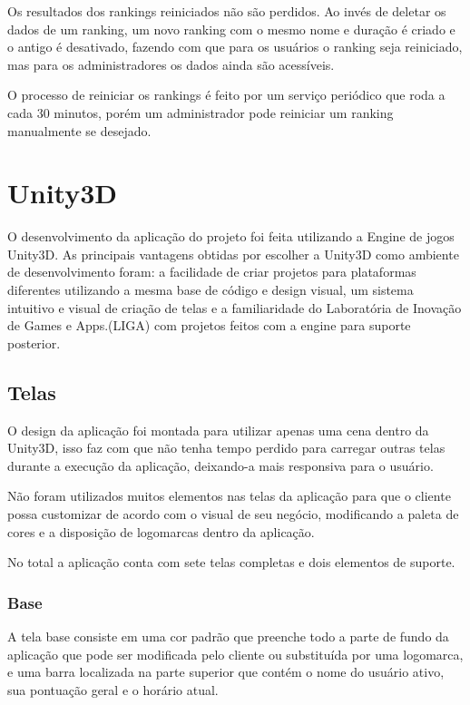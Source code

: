 Os resultados dos rankings reiniciados não são perdidos. Ao invés de deletar os dados de um ranking, um novo ranking com o mesmo nome e duração é criado e o antigo é desativado, fazendo com que para os usuários o ranking seja reiniciado, mas para os administradores os dados ainda são acessíveis.

O processo de reiniciar os rankings é feito por um serviço periódico que roda a cada 30 minutos, porém um administrador pode reiniciar um ranking manualmente se desejado.

\section{Unity3D}
\label{sec:unity3d}

O desenvolvimento da aplicação do projeto foi feita utilizando a Engine de jogos Unity3D. As principais vantagens obtidas por escolher a Unity3D como ambiente de desenvolvimento foram: a facilidade de criar projetos
para plataformas diferentes utilizando a mesma base de código e design visual, um sistema intuitivo e visual de criação de telas e a familiaridade do Laboratória de Inovação de Games e Apps.(LIGA) com projetos feitos com a engine para suporte posterior.

\subsection{Telas}
\label{subsec:telas}

O design da aplicação foi montada para utilizar apenas uma cena dentro da Unity3D, isso faz com que não tenha tempo perdido para carregar outras telas durante a execução da aplicação, deixando-a mais responsiva para o usuário.

Não foram utilizados muitos elementos nas telas da aplicação para que o cliente possa customizar de acordo com o visual de seu negócio, modificando a paleta de cores e a disposição de logomarcas dentro da aplicação.

No total a aplicação conta com sete telas completas e dois elementos de suporte.

\subsubsection{Base}
\label{subsubsec:base}

A tela base consiste em uma cor padrão que preenche todo a parte de fundo da aplicação que pode ser modificada pelo cliente ou substituída por uma logomarca, e uma barra localizada na parte superior que contém o nome do usuário ativo, sua pontuação geral e o horário atual.


